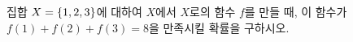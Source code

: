 집합 $X=\{1{,}\mkern3mu\mathopen{}2{,}\mkern3mu\mathopen{}3\}$에 대하여 $X$에서 $X$로의 함수 $f$를 만들 때, 이 함수가 $f(1)+f(2)+f(3)=8$을 만족시킬 확률을 구하시오.
